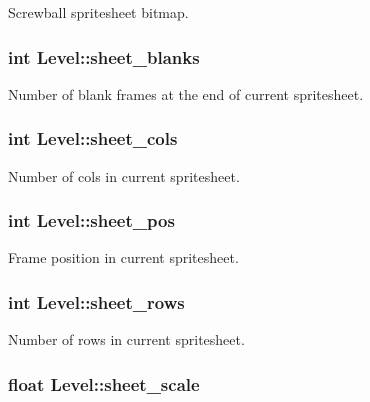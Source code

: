 Screwball spritesheet bitmap. \hypertarget{structLevel_aebaaba311e5d4842fdbd8c50edd40808}{
\subsubsection[{sheet\-\_\-blanks}]{\setlength{\rightskip}{0pt plus 5cm}int Level\-::sheet\-\_\-blanks}}\label{structLevel_aebaaba311e5d4842fdbd8c50edd40808}
Number of blank frames at the end of current spritesheet. \hypertarget{structLevel_a8a5c443169a4ff15f330a65473eedb1b}{
\subsubsection[{sheet\-\_\-cols}]{\setlength{\rightskip}{0pt plus 5cm}int Level\-::sheet\-\_\-cols}}\label{structLevel_a8a5c443169a4ff15f330a65473eedb1b}
Number of cols in current spritesheet. \hypertarget{structLevel_a21c699af201ffe60ccd1319b3f540947}{
\subsubsection[{sheet\-\_\-pos}]{\setlength{\rightskip}{0pt plus 5cm}int Level\-::sheet\-\_\-pos}}\label{structLevel_a21c699af201ffe60ccd1319b3f540947}
Frame position in current spritesheet. \hypertarget{structLevel_a6d608b79c9b4dd8a5efc0c7e5fb482b0}{
\subsubsection[{sheet\-\_\-rows}]{\setlength{\rightskip}{0pt plus 5cm}int Level\-::sheet\-\_\-rows}}\label{structLevel_a6d608b79c9b4dd8a5efc0c7e5fb482b0}
Number of rows in current spritesheet. \hypertarget{structLevel_a267a140bd3de1fc3f23a88623de425ed}{
\subsubsection[{sheet\-\_\-scale}]{\setlength{\rightskip}{0pt plus 5cm}float Level\-::sheet\-\_\-scale}}\label{structLevel_a267a140bd3de1fc3f23a88623de425ed}
